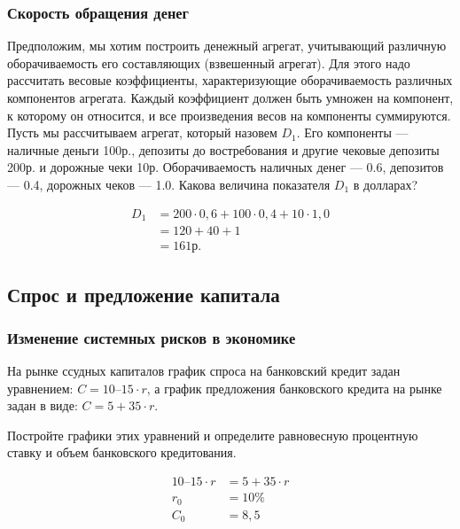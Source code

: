 \documentclass[12pt, table, a4paper,twoside]{exam}
\begin{document}
\begin{questions}
\vfill\null\pagebreak
\subsubsection{Скорость обращения денег}
Предположим, мы хотим построить денежный агрегат, учитывающий различную оборачиваемость его составляющих (взвешенный агрегат). Для этого надо рассчитать весовые коэффициенты, характеризующие оборачиваемость различных компонентов агрегата. Каждый коэффициент должен быть умножен на компонент, к которому он относится, и все произведения весов на компоненты суммируются. Пусть мы рассчитываем агрегат, который назовем $D_1$. Его компоненты — наличные деньги 100р., депозиты до востребования и другие чековые депозиты 200р. и дорожные чеки 10р. Оборачиваемость наличных денег — 0.6, депозитов — 0.4, дорожных чеков — 1.0. Какова величина показателя $D_1$ в долларах?
\question[10] 

\begin{solution}[12em]
	\begin{align*}
	D_1 &= 200 \cdot 0,6 + 100 \cdot 0,4 + 10 \cdot 1,0 \\
	&= 120 + 40 + 1 \\
	&= 161р. 
	\end{align*}
\end{solution}




\vfill\null\pagebreak
\subsection{Спрос и предложение капитала}
\subsubsection{Изменение системных рисков в экономике}
\question[20] На рынке ссудных капиталов график спроса на банковский кредит задан уравнением:
$C = 10 – 15 \cdot r$,
а график предложения банковского кредита на рынке задан в виде:
$C = 5 + 35 \cdot r$.

\noaddpoints

\begin{subparts}
	\subpart[5] Постройте графики этих уравнений и определите равновесную процентную ставку и объем банковского кредитования.
	
	\begin{solution}[12em]
	\begin{align*}
	10 – 15 \cdot r &= 5 + 35 \cdot r\\
	r_0 &= 10\%\\
	C_0 &= 8,5
	\end{align*}
	\end{solution}
	

\end{subparts}
\end{questions}
\end{document}
